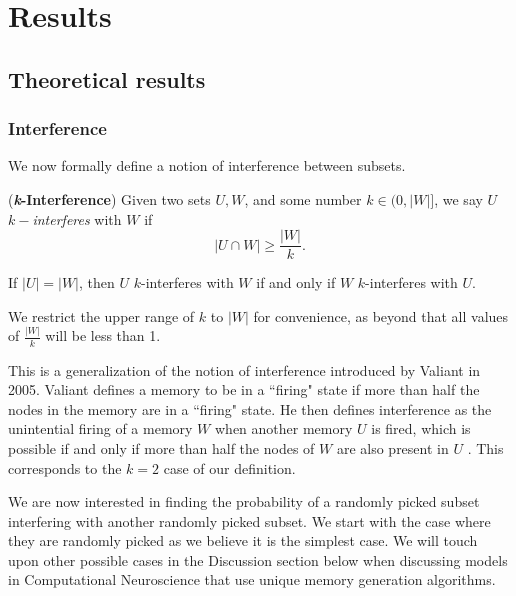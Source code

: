 \chapter{Results}

\section{Theoretical results}
\subsection{Interference}

We now formally define a notion of interference between subsets. 

\begin{definition}
    (\textbf{\textit{k}-Interference}) Given two sets $U, W$, and some number $k \in (0,|W|]$, we say $U$ $k-$\textit{interferes} with $W$ if 
    \begin{equation}
        |U \cap W| \ge  \frac{|W|}{k}.
    \end{equation}
\end{definition}

\begin{corollary}
    \label{collorary:k-int-equals}
        If $|U| = |W|$, then $U$ $k$-interferes with $W$ if and only if $W$ $k$-interferes with $U$.
    \end{corollary}
    
We restrict the upper range of $k$ to $|W|$ for convenience, as beyond that all values of $\frac{|W|}{k}$ will be less than 1.

This is a generalization of the notion of interference introduced by Valiant in 2005. Valiant defines a memory to be in a ``firing" state if more than half the nodes in the memory are in a ``firing" state. He then defines interference as the unintential firing of a memory $W$ when another memory $U$ is fired, which is possible if and only if more than half the nodes of $W$ are also present in $U$ \cite{valiant2005memorization}. This corresponds to the $k = 2$ case of our definition. 

We are now interested in finding the probability of a randomly picked subset interfering with another randomly picked subset. We start with the case where they are randomly picked as we believe it is the simplest case. We will touch upon other possible cases in the Discussion section below when discussing models in Computational Neuroscience that use unique memory generation algorithms.

